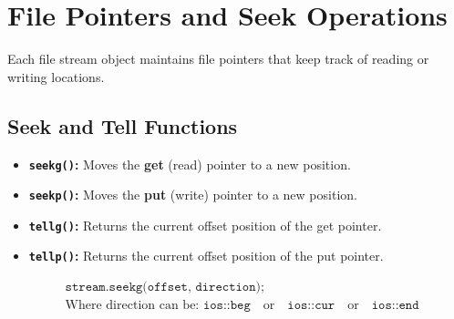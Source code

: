 \documentclass[12pt,a4paper]{article}
\begin{document}
\section{File Pointers and Seek Operations}

Each file stream object maintains file pointers that keep track of reading or writing locations.

\subsection{Seek and Tell Functions}
\begin{itemize}[leftmargin=*, itemsep=3.5pt]
  \item \textbf{\texttt{seekg()}:} Moves the \textbf{get} (read) pointer to a new position.
  \item \textbf{\texttt{seekp()}:} Moves the \textbf{put} (write) pointer to a new position.
  \item \textbf{\texttt{tellg()}:} Returns the current offset position of the get pointer.
  \item \textbf{\texttt{tellp()}:} Returns the current offset position of the put pointer.
\end{itemize}

\begin{tcolorbox}[defbox, title={\textbf{Seek Syntax Parameters}}]
\begin{align}
  &\texttt{stream.seekg(offset, direction);} \\
  &\text{Where direction can be: } \texttt{ios::beg} \quad \text{or} \quad \texttt{ios::cur} \quad \text{or} \quad \texttt{ios::end}
\end{align}
\end{tcolorbox}
\end{document}

